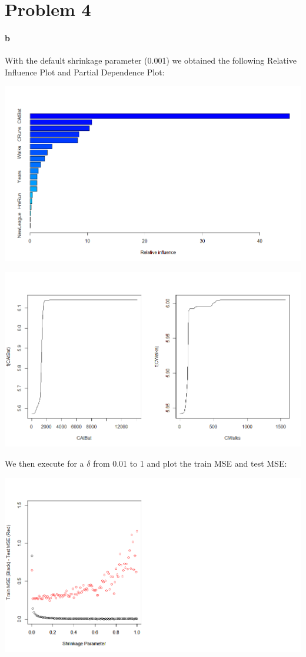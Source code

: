\section*{Problem 4}

\paragraph{b} With the default shrinkage parameter (0.001) we obtained the following Relative Influence Plot and Partial Dependence Plot: 

\includegraphics[width=\textwidth]{img/relativeInfluencePlot.png}

\includegraphics[width=\textwidth]{img/partialDependencePlots.png}

We then execute for a $\delta$ from 0.01 to 1 and plot the train MSE and test MSE: 

\includegraphics[width=\textwidth]{img/shrkg.png}

